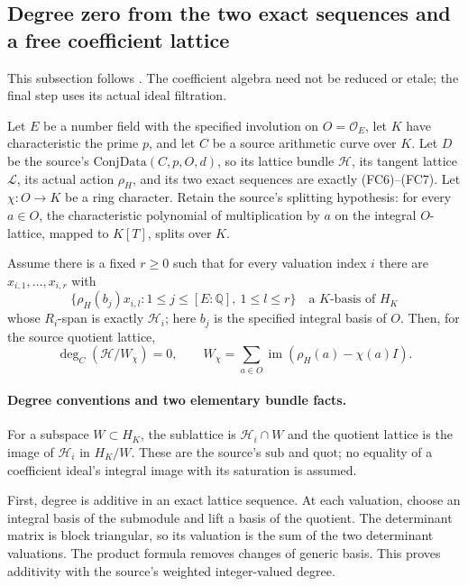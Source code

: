 \subsection{Degree zero from the two exact sequences and a free coefficient lattice}
\label{subsec:faithful-character-quotient-degree-zero}

This subsection follows
.
The coefficient algebra need not be reduced or etale;
the final step uses its actual ideal filtration.

\begin{srproposition}\label{prop:faithful-character-quotient-degree-zero}
Let \(E\) be a number field with the specified involution
on \(O=\mathcal O_E\), let \(K\) have characteristic
the prime \(p\), and let \(C\) be a source arithmetic
curve over \(K\).
Let \(D\) be the source's
\(\mathrm{ConjData}(C,p,O,d)\), so its lattice bundle
\(\mathcal H\), its tangent lattice \(\mathcal L\),
its actual action \(\rho_H\), and its two exact
sequences are exactly (FC6)--(FC7).
Let \(\chi:O\to K\) be a ring character.
Retain the source's splitting hypothesis: for every
\(a\in O\), the characteristic polynomial of
multiplication by \(a\) on the integral \(O\)-lattice,
mapped to \(K[T]\), splits over \(K\).

Assume there is a fixed \(r\ge0\) such that for every
valuation index \(i\) there are \(x_{i,1},\ldots,x_{i,r}\)
with
\[
 \bigl\{\rho_H(b_j)x_{i,l}:
       1\le j\le[E:\mathbb Q],\ 1\le l\le r\bigr\}
 \quad\text{a }K\text{-basis of }H_K
\]
whose \(R_i\)-span is exactly \(\mathcal H_i\);
here \(b_j\) is the specified integral basis of \(O\).
Then, for the source quotient lattice,
\[
 \deg_C\!\left(\mathcal H/W_\chi\right)=0,\qquad
 W_\chi=\sum_{a\in O}\operatorname{im}
                                  (\rho_H(a)-\chi(a)I).
 \tag{FZ1}\label{eq:faithful-character-quotient-zero}
\]
\end{srproposition}

\paragraph{Degree conventions and two elementary bundle facts.}
For a subspace \(W\subset H_K\), the sublattice is
\(\mathcal H_i\cap W\) and the quotient lattice is
the image of \(\mathcal H_i\) in \(H_K/W\).
These are the source's \(\mathrm{sub}\) and
\(\mathrm{quot}\); no equality of a coefficient ideal's
integral image with its saturation is assumed.

First, degree is additive in an exact lattice sequence.
At each valuation, choose an integral basis of the
submodule and lift a basis of the quotient.
The determinant matrix is block triangular, so its
valuation is the sum of the two determinant valuations.
The product formula removes changes of generic basis.
This proves additivity with the source's weighted
integer-valued degree.

